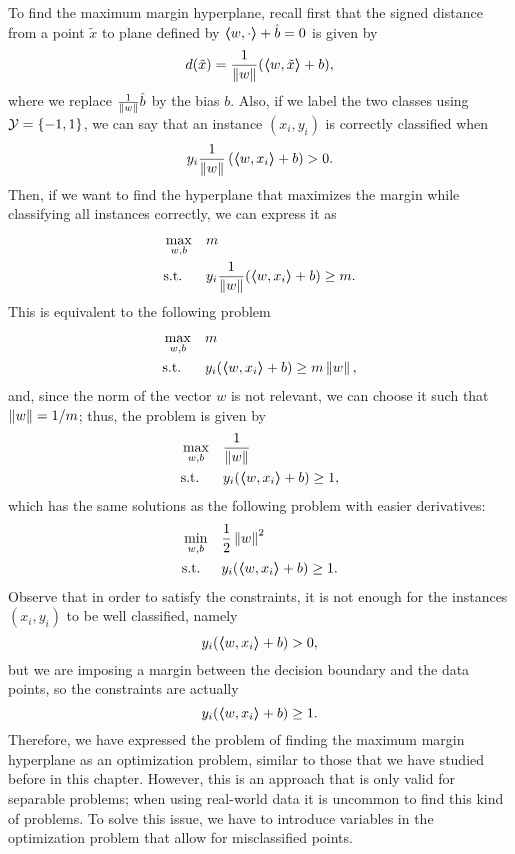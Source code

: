 To find the maximum margin hyperplane, recall first that the signed distance from a point $\tilde{x}$ to plane defined by $\bm{\left\langle} w, \cdot \bm{\right\rangle} + \hat{b} = 0$ is given by 
\begin{equation}
    \nonumber
    d(\tilde{x}) = \frac{1}{\left\lVert w\right\rVert} (\bm{\left\langle} w, \tilde{x} \bm{\right\rangle} + b) ,
\end{equation}
where we replace $\frac{1}{\left\lVert w\right\rVert} \hat{b}$ by the bias $b$.
Also, if we label the two classes using $\mathcal{Y} = \left\{-1, 1\right\}$, we can say that an instance $(x_i, y_i)$ is correctly classified when $$y_i \frac{1}{\left\lVert w\right\rVert} \left(\bm{\left\langle} w, x_i \bm{\right\rangle} + b \right) > 0 .$$
Then, if we want to find the hyperplane that maximizes the margin while classifying all instances correctly, we can express it as
\begin{equation}\nonumber
    \begin{aligned}
        &\max_{w, b} & & m \\
        & \text{s.t.} & & y_i \frac{1}{\left\lVert w\right\rVert} (\bm{\left\langle} w, x_i \bm{\right\rangle} + b) \geq m .         
    \end{aligned}  
\end{equation}
This is equivalent to the following problem 
\begin{equation}\nonumber
    \begin{aligned}
        &\max_{w, b} & & m \\
        & \text{s.t.} & & y_i (\bm{\left\langle} w, x_i \bm{\right\rangle} + b) \geq m \left\lVert w\right\rVert ,       
    \end{aligned}  
\end{equation}
and, since the norm of the vector $w$ is not relevant, we can choose it such that $\left\lVert w\right\rVert = 1 / m$; thus, the problem is given by
\begin{equation}\nonumber
    \begin{aligned}
        &\max_{w, b} & & \frac{1}{\left\lVert w\right\rVert} \\
        & \text{s.t.} & & y_i (\bm{\left\langle} w, x_i \bm{\right\rangle} + b) \geq 1 ,       
    \end{aligned}  
\end{equation}
which has the same solutions as the following problem with easier derivatives:
\begin{equation}
    \label{eq:separable_primal}
    \begin{aligned}
        &\min_{w, b} & & \frac{1}{2} \norm{w}^2 \\
        & \text{s.t.} & & y_i (\dotp{w}{x_i} + b) \geq 1 .       
    \end{aligned}  
\end{equation}
%
Observe that in order to satisfy the constraints, it is not enough for the instances $(x_i, y_i)$ to be well classified, namely 
$$ y_i (\bm{\left\langle} w, x_i \bm{\right\rangle} + b) > 0 ,$$
but we are imposing a margin between the decision boundary and the data points, so the constraints are actually 
$$ y_i (\bm{\left\langle} w, x_i \bm{\right\rangle} + b) \geq 1 .$$
Therefore, we have expressed the problem of finding the maximum margin hyperplane as an optimization problem, similar to those that we have studied before in this chapter. However, this is an approach that is only valid for separable problems; when using real-world data it is uncommon to find this kind of problems. To solve this issue, we have to introduce variables in the optimization problem that allow for misclassified points.

